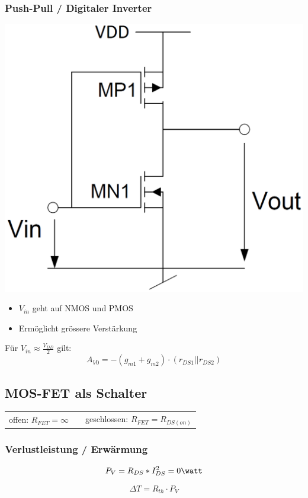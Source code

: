 \subsubsection{Push-Pull / Digitaler Inverter}  %

    \begin{minipage}[c]{0.35\columnwidth}
        \includegraphics[width=\columnwidth]{images/push_pull_digital_inverter.png}
    \end{minipage}
    \hfill
    \begin{minipage}[c]{0.5\columnwidth}
        \begin{itemize}
            \item $V_{in}$ geht auf NMOS und PMOS
            \item Ermöglicht grössere Verstärkung
        \end{itemize}
        
        \vspace{0.3cm}
        Für $V_{in} \approx \frac{V_{DD}}{2}$ gilt:
        $$ A_{V0} = -(g_{m1} + g_{m2}) \cdot (r_{DS1} || r_{DS2}) $$
    \end{minipage}


\subsection{MOS-FET als Schalter}

    \begin{tabular}{l c l}
        offen: $R_{FET} = \infty$ &  & geschlossen: $R_{FET} = R_{DS(on)} $
    \end{tabular}


\subsubsection{Verlustleistung / Erwärmung}

    \begin{minipage}[c]{0.48\columnwidth}
        $$ P_V = R_{DS} * I_{DS}^2 = 0 \watt $$
    \end{minipage}
    \hfill
    \begin{minipage}[c]{0.48\columnwidth}
        $$ \Delta T = R_{th} \cdot P_V $$
    \end{minipage}
